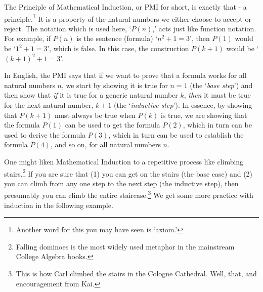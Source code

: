 \documentclass{ximera}
\begin{document}
\smallskip

 The Principle of Mathematical Induction, or PMI for short, is exactly that - a principle.\footnote{Another word for this you may have seen is `axiom.'}  It is a property of the natural numbers we either choose to accept or reject.  The notation which is used here, `$P(n)$,' acts just like function notation.  For example, if $P(n)$ is the sentence (formula)  `$n^2 + 1 = 3$', then $P(1)$ would be `$1^2 + 1 = 3$', which is false.  In this case, the construction $P(k+1)$ would be `$(k+1)^2 + 1 = 3$'.  

\smallskip

In English, the PMI says that if we want to prove that a formula works for all natural numbers $n$, we start by showing it is true for $n=1$ (the  `\textit{base step}') and then show that \textit{if} it is true for a generic natural number $k$, \textit{then} it must be true for the next natural number, $k+1$ (the  `\textit{inductive step}').  In essence, by showing that $P(k+1)$ must always be true when $P(k)$ is true, we are showing that the formula $P(1)$ can be used to get the formula $P(2)$, which in turn can be used to derive the formula $P(3)$, which in turn can be used to establish the formula $P(4)$, and so on, for all natural numbers $n$.


\smallskip

One might liken Mathematical Induction to a repetitive process like climbing stairs.\footnote{Falling dominoes is the most widely used metaphor in the mainstream College Algebra books.}  If you are sure that (1) you can get on the stairs (the base case) and (2) you can climb from any one step to the next step (the inductive step), then presumably you can climb the entire staircase.\footnote{This is how Carl climbed the stairs in the Cologne Cathedral.  Well, that, and  encouragement from  Kai.}  We get some more practice with induction in the following example.

\newpage
\end{document}
